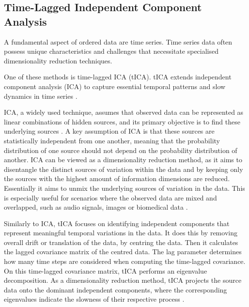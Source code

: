 \documentclass[pdftex,12pt,a4paper]{report}
\begin{document}
\subsection{Time-Lagged Independent Component Analysis}
A fundamental aspect of ordered data are time series.
Time series data often possess unique characteristics and challenges that necessitate specialised dimensionality reduction techniques.

One of these methods is time-lagged ICA (tICA).
tICA extends independent component analysis (ICA) to capture essential temporal patterns and slow dynamics in time series \cite{tICA}.

ICA, a widely used technique, assumes that observed data can be represented as linear combinations of hidden sources, and its primary objective is to find these underlying sources \cite{ICA-book}.
A key assumption of ICA is that these sources are statistically independent from one another, meaning that the probability distribution of one source should not depend on the probability distribution of another.
ICA can be viewed as a dimensionality reduction method, as it aims to disentangle the distinct sources of variation within the data and by keeping only the sources with the highest amount of information dimensions are reduced.
Essentially it aims to unmix the underlying sources of variation in the data.
This is especially useful for scenarios where the observed data are mixed and overlapped, such as audio signals, images or biomedical data \cite{ICA-book}.

Similarly to ICA, tICA focuses on identifying independent components that represent meaningful temporal variations in the data.
It does this by removing overall drift or translation of the data, by centring the data.
Then it calculates the lagged covariance matrix of the centred data.
The lag parameter determines how many time steps are considered when computing the time-lagged covariance.
On this time-lagged covariance matrix, tICA performs an eigenvalue decomposition.
As a dimensionality reduction method, tICA projects the source data onto the dominant independent components, where the corresponding eigenvalues indicate the slowness of their respective process \cite{tICA}.
\end{document}
